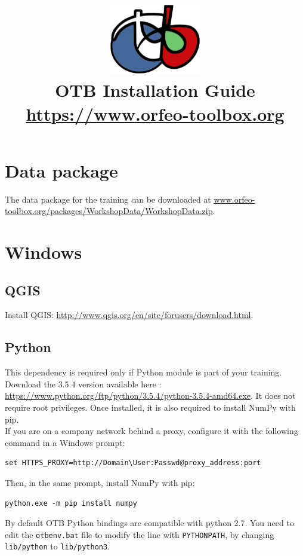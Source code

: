 \documentclass[10pt,a4paper]{article}
\title{\includegraphics[scale=1]{Art/otb-logo.png}\\
  OTB Installation Guide\\
  {\small\url{https://www.orfeo-toolbox.org}}
}
\begin{document}
\maketitle

\tableofcontents

\clearpage
\section{Data package}

The data package for the training can be downloaded at
\url{www.orfeo-toolbox.org/packages/WorkshopData/WorkshopData.zip}.

\section{Windows}

\subsection{QGIS}
Install QGIS: \url{http://www.qgis.org/en/site/forusers/download.html}.

\subsection{Python}

This dependency is required only if Python module is part of your
training. Download the 3.5.4 version available here :
\url{https://www.python.org/ftp/python/3.5.4/python-3.5.4-amd64.exe}. It does
not require root privileges. Once installed, it is also required to install
NumPy with pip.\\

If you are on a company network behind a proxy, configure it with the following
command in a Windows prompt:

\begin{verbatim}
set HTTPS_PROXY=http://Domain\User:Passwd@proxy_address:port
\end{verbatim}

Then, in the same prompt, install NumPy with pip:

\begin{verbatim}
python.exe -m pip install numpy
\end{verbatim}

By default OTB Python bindings are compatible with python 2.7. You need to edit
the \verb?otbenv.bat? file to modify the line with \verb?PYTHONPATH?, by
changing \verb?lib/python? to \verb?lib/python3?.
\end{document}
